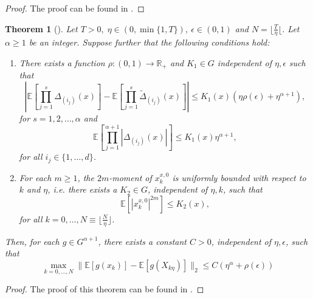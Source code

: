 \documentclass[12pt]{article}
\newtheorem{theorem}{Theorem}[section]
\theoremstyle{definition}
\numberwithin{equation}{section}
\newcommand{\R}{\mathbb{R}}
\newcommand{\ev}[1]{\mathbb{E}\left[{#1}\right]}
\newcommand{\norm}[1]{\lVert{#1}\rVert_2}
\begin{document}
\begin{proof}
  The proof can be found in \cite{liStochasticModifiedEquations2019}.
\end{proof}
\begin{theorem}[]
  \label{thm:approximation}
  Let $T > 0, \; \eta \in (0,\min\{1,T\}), \: \epsilon \in (0,1)$ and $N = \lfloor \frac{T}{\eta} \lfloor$. Let $\alpha \geq 1$ be an integer. Suppose further that the following conditions hold:
  \begin{enumerate}[label=(\roman*)]
    \item There exists a function $\rho : (0,1) \rightarrow \R_+$ and $K_1 \in G$ independent of $\eta, \epsilon$ such that
    \begin{equation*}
      \left\lvert \ev{\prod_{j=1}^s \Delta_{(i_j)}(x)} - \ev{\prod_{j=1}^s \tilde{\Delta}_{(i_j)}(x)}\right\rvert \leq K_1(x)(\eta \rho(\epsilon) + \eta^{\alpha+1}),
    \end{equation*}
    for $s=1,2,\dots,\alpha$ and
    \begin{equation*}
      \ev{\prod_{j=1}^{\alpha+1}\left\lvert \Delta_{(i_j)}(x)\right\rvert} \leq K_1(x)\eta^{\alpha+1},
    \end{equation*}
    for all $i_j \in \{1,\dots,d\}$.
    \item For each $m \geq 1$, the $2m$-moment of $x_k^{x,0}$ is uniformly bounded with respect to $k$ and $\eta$, i.e. there exists a $K_2 \in G$, independent of $\eta, k$, such that
    \begin{equation*}
      \ev{\left\lvert x_k^{x,0} \right\rvert^{2m}} \leq K_2(x),
    \end{equation*}
    for all $k = 0, \dots, N \equiv \lfloor \frac{N}{\eta} \rfloor$.
  \end{enumerate}
  Then, for each $g \in G^{\alpha + 1}$, there exists a constant $C > 0$, independent of $\eta, \epsilon$, such that
  \begin{equation*}
    \max_{k=0,\dots,N}\norm{\ev{g(x_k)} - \ev{g(X_{k\eta})}} \leq C(\eta^{\alpha} + \rho(\epsilon))
  \end{equation*}
\end{theorem}
\begin{proof}
  The proof of this theorem can be found in \cite{liStochasticModifiedEquations2019}.
\end{proof}
\end{document}
